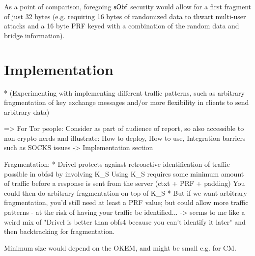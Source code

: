As a point of comparison, foregoing $\mathsf{sObf}$ security would allow for a first fragment of just 32 bytes (e.g. requiring 16 bytes of randomized data to thwart multi-user attacks and a 16 byte PRF keyed with a combination of the random data and bridge information).

\newpage 

\section{Implementation} \label{sec:implementation}

* (Experimenting with implementing different traffic patterns, such as arbitrary fragmentation of key
exchange messages and/or more flexibility in clients to send arbitrary data)


=> For Tor people: Consider as part of audience of report, so also accessible to non-crypto-nerds and illustrate: How to deploy, How to use, Integration barriers such as SOCKS issues -> Implementation section


Fragmentation:
* Drivel protects against retroactive identification of traffic possible in obfs4 by involving K_S
    Using K_S requires some minimum amount of traffic before a response is sent from the server (ctxt + PRF + padding)
    You could then do arbitrary fragmentation on top of K_S
* But if we want arbitrary fragmentation, you'd still need at least a PRF value; but could allow more traffic patterns - at the risk of having your traffic be identified...
-> seems to me like a weird mix of "Drivel is better than obfs4 because you can't identify it later" and then backtracking for fragmentation.

Minimum size would depend on the OKEM, and might be small e.g. for CM.

